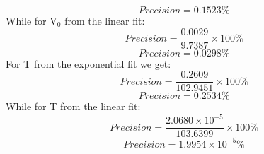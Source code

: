 \documentclass[12pt, a4paper]{article}
\begin{document}
\begin{equation*}
    Precision = 0.1523\%
\end{equation*}
While for $\text{V}_0$ from the linear fit:
\begin{equation*}
    Precision = \frac{0.0029}{9.7387}{\times} 100\%
\end{equation*}
\begin{equation*}
    Precision = 0.0298\%
\end{equation*}
For T from the exponential fit we get:
\begin{equation*}
    Precision = \frac{0.2609}{102.9451}{\times} 100\%
\end{equation*}
\begin{equation*}
    Precision = 0.2534\%
\end{equation*}
While for T from the linear fit:
\begin{equation*}
    Precision = \frac{2.0680{\times}10^{-5}}{103.6399}{\times} 100\%
\end{equation*}
\begin{equation*}
    Precision = 1.9954{\times} 10^{-5}\%
\end{equation*}
\end{document}
